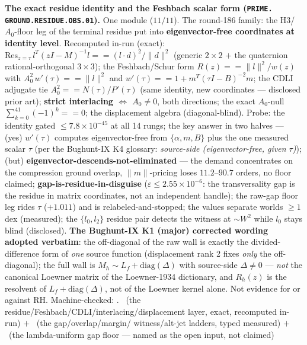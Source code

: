 \par\smallskip\noindent\textbf{The exact residue identity and the
Feshbach scalar form (\texttt{PRIME.\allowbreak
GROUND.\allowbreak RESIDUE.\allowbreak OBS.01}).}
One module ($11/11$).  The round-186 family: the H3/$A_0$-floor
leg of the terminal residue put into \textbf{eigenvector-free
coordinates at identity level}.  Recomputed in-run (exact):
$\mathrm{Res}_{z=\tau}\, l^T(zI - M)^{-1}l == (l\cdot
d)^2/\|d\|^2$ (generic $2\times 2$ $+$ the quaternion
rational-orthogonal $3\times 3$); the Feshbach/Schur form $R(z)
== \|l\|^2/w(z)$ with $A_0^2\,w'(\tau) == \|l\|^2$ and $w'(\tau)
== 1 + m^T(\tau I - B)^{-2}m$; the CDLI adjugate tie $A_0^2 ==
N(\tau)/P'(\tau)$ (same identity, new coordinates --- disclosed
prior art); \textbf{strict interlacing $\Leftrightarrow$ $A_0 \ne
0$}, both directions; the exact $A_0$-null
$\sum_{k=0}^{41}(-1)^k == 0$; the displacement algebra
(diagonal-blind).  Probe: the identity gated $\le
7.8\times10^{-45}$ at all 14 rungs; the key answer in two halves
--- (yes) $w'(\tau)$ computes eigenvector-free from $\{\alpha, m,
B\}$ plus the one measured scalar $\tau$ (per the Bughunt-IX K4
glossary: \emph{source-side (eigenvector-free, given $\tau$)});
(but) \textbf{eigenvector-descends-not-eliminated} --- the demand
concentrates on the compression ground overlap, $\|m\|$-pricing
loses $11.2$--$90.7$ orders, no floor claimed;
\textbf{gap-is-residue-in-disguise} ($\varepsilon \le
2.55\times10^{-6}$: the transversality gap is the residue in
matrix coordinates, not an independent handle); the raw-gap floor
leg rides $\tau$ ($+1.011$) and is relabeled-and-stopped; the
values separate worlds $\ge 1$ dex (measured); the $\{l_0, l_2\}$
residue pair detects the witness at ${\sim}W^2$ while $l_0$ stays
blind (disclosed).  \textbf{The Bughunt-IX K1 (major) corrected
wording adopted verbatim}: the off-diagonal of the raw wall is
exactly the divided-difference form of \emph{one} source function
(displacement rank 2 fixes \emph{only} the off-diagonal); the
full wall is $M_h \sim L_f + \mathrm{diag}(\Delta)$ with
source-side $\Delta \ne 0$ --- \emph{not} the canonical Loewner
matrix of the Loewner-1934 dictionary, and $R_h(z)$ is the
resolvent of $L_f + \mathrm{diag}(\Delta)$, not of the Loewner
kernel alone.  Not evidence for or against RH.
Machine-checked: .
\mE\ (the residue/Feshbach/CDLI/interlacing/displacement layer,
exact, recomputed in-run) $+$ \mC\ (the gap/overlap/margin/
witness/alt-jet ladders, typed measured) $+$ \mO\ (the
lambda-uniform gap floor --- named as the open input, not
claimed)
\par\smallskip


